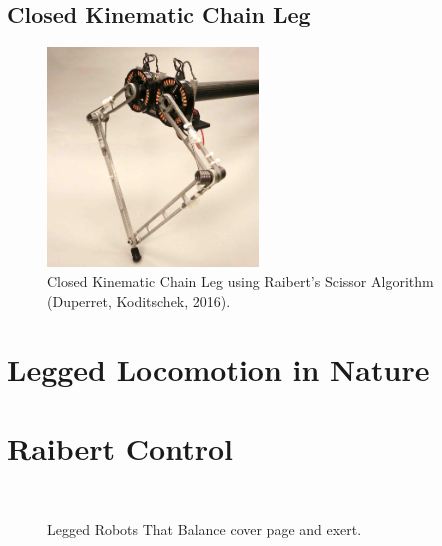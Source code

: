 \subsection{Closed Kinematic Chain Leg}

\begin{figure}
\centering
\includegraphics[width=0.5\textwidth]{images/literature/pen-state-scissor.jpg} 
\caption{Closed Kinematic Chain Leg using Raibert's Scissor Algorithm (Duperret, Koditschek, 2016).\cite{Duperret}}
\label{fig:pen-state-scissor}
\end{figure}

\section{Legged Locomotion in Nature}

\section{Raibert Control}

\begin{figure}
\centering
{}
~
\caption{Legged Robots That Balance cover page and exert.\cite{Raibert1989}}
\end{figure}

